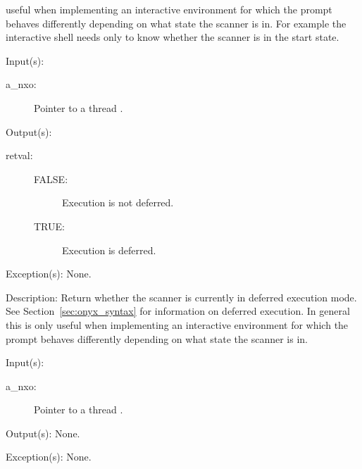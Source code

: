 \begin{capi}
\begin{capilist}
		useful when implementing an interactive environment for which
		the prompt behaves differently depending on what state the
		scanner is in.  For example the interactive  shell
		needs only to know whether the scanner is in the start state.
	\end{capilist}
\label{nxo_thread_deferred}
	\begin{capilist}
	\item[Input(s): ]
		\begin{description}\item[]
		\item[a\_nxo: ]
			Pointer to a thread .
		\end{description}
	\item[Output(s): ]
		\begin{description}\item[]
		\item[retval: ]
			\begin{description}\item[]
			\item[FALSE: ]
				Execution is not deferred.
			\item[TRUE: ]
				Execution is deferred.
			\end{description}
		\end{description}
	\item[Exception(s): ] None.
	\item[Description: ]
		Return whether the scanner is currently in deferred execution
		mode.  See Section~\ref{sec:onyx_syntax} for information on
		deferred execution.  In general this is only useful when
		implementing an interactive environment for which the prompt
		behaves differently depending on what state the scanner is in.
	\end{capilist}
\label{nxo_thread_reset}
	\begin{capilist}
	\item[Input(s): ]
		\begin{description}\item[]
		\item[a\_nxo: ]
			Pointer to a thread \classname{nxo}.
		\end{description}
	\item[Output(s): ] None.
	\item[Exception(s): ] None.

\end{capilist}
\end{capi}
